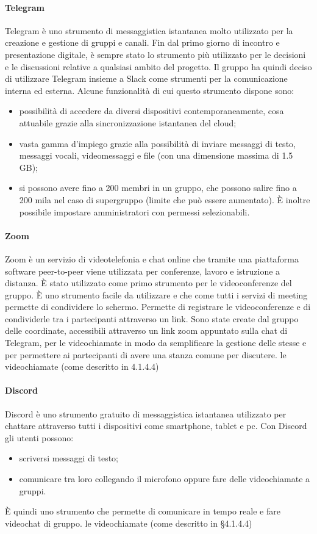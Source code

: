 \paragraph{Telegram}
Telegram è uno strumento di messaggistica istantanea molto utilizzato per la creazione e gestione di gruppi e canali. Fin dal primo giorno di incontro e presentazione digitale, è sempre stato lo strumento più utilizzato per le decisioni e le discussioni relative a qualsiasi ambito del progetto. Il gruppo ha quindi deciso di utilizzare Telegram insieme a Slack come strumenti per la comunicazione interna ed esterna. Alcune funzionalità di cui questo strumento dispone sono:
\begin{itemize}
    \item possibilità di accedere da diversi dispositivi contemporaneamente, cosa attuabile
          grazie alla sincronizzazione istantanea del cloud;
    \item vasta gamma d’impiego grazie alla possibilità di inviare messaggi di testo, messaggi
          vocali, videomessaggi e file (con una dimensione massima di 1.5 GB);
    \item si possono avere fino a 200 membri in un gruppo, che possono salire fino a 200 mila nel
          caso di supergruppo (limite che può essere aumentato). È inoltre possibile impostare
          amministratori con permessi selezionabili.
\end{itemize}

\paragraph{Zoom}
Zoom è un servizio di videotelefonia e chat online che tramite una piattaforma software peer-to-peer viene utilizzata per conferenze, lavoro e istruzione a distanza. È stato utilizzato come primo strumento per le videoconferenze del gruppo. È uno strumento facile da utilizzare e che come tutti i servizi di meeting permette di condividere lo schermo. Permette di registrare le videoconferenze e di condividerle tra i partecipanti attraverso un link. Sono state create dal gruppo delle coordinate, accessibili attraverso un link zoom appuntato sulla chat di Telegram, per le videochiamate in modo da semplificare la gestione delle stesse e per permettere ai partecipanti di avere una stanza comune per discutere.
le videochiamate (come descritto in 4.1.4.4)

\paragraph{Discord}
Discord è uno strumento gratuito di messaggistica istantanea utilizzato per chattare attraverso tutti i dispositivi come smartphone, tablet e pc. Con Discord gli utenti possono:
\begin{itemize}
    \item scriversi messaggi di testo;
    \item comunicare tra loro collegando il microfono oppure fare delle videochiamate a gruppi.
\end{itemize}
È quindi uno strumento che permette di comunicare in tempo reale e fare videochat di gruppo.
le videochiamate (come descritto in §4.1.4.4)

